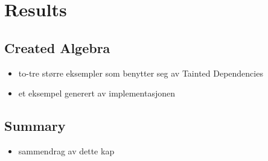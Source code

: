 \chapter{Results}
\label{chapter:results}


\section{Created Algebra}
\begin{itemize}
  \item to-tre større eksempler som benytter seg av Tainted Dependencies
  \item et eksempel generert av implementasjonen
\end{itemize}





\section{Summary}
\label{sect:res:summary}
\begin{itemize}
  \item sammendrag av dette kap
\end{itemize}
